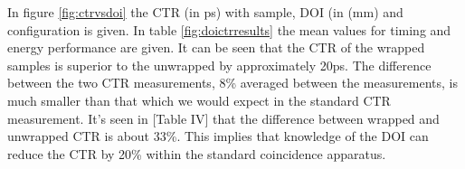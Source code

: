 In figure \ref{fig:ctrvsdoi} the CTR (in ps) with sample, DOI (in (mm) and configuration is given. In table \ref{fig:doictrresults} the mean values for timing and energy performance are given. It can be seen that the CTR of the wrapped samples is superior to the unwrapped by approximately 20ps. The difference between the two CTR measurements, 8\% averaged between the measurements, is much smaller than that which we would expect in the standard CTR measurement. It's seen in [Table IV]\cite{r_Paganoni_Pauwels_et_al__2011} that the difference between wrapped and unwrapped CTR is about 33\%. This implies that knowledge of the DOI can reduce the CTR by 20\% within the standard coincidence apparatus.